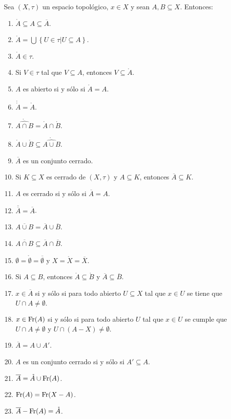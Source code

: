 \documentclass[12pt]{report}
\theoremstyle{largebreak}
\newcommand{\Int}[1]{\ensuremath{\mathring{#1}}}
\newcommand{\Cls}[1]{\ensuremath{\overline{#1}}}
\newcommand{\Fr}[1]{\ensuremath{\textup{Fr}(#1)}}
\begin{document}
    \begin{propo}
        Sea $(X,\tau)$ un espacio topológico, $x\in X$ y sean $A,B\subseteq X$. Entonces:
        \begin{enumerate}
            \item $\Int{A}\subseteq A\subseteq\Cls{A}$.
            \item $\Int{A}=\bigcup\left\{U\in\tau\big|U\subseteq A \right\}$.
            \item $\Int{A}\in\tau$.
            \item Si $V\in\tau$ tal que $V\subseteq A$, entonces $V\subseteq\Int{A}$.
            \item $A$ es abierto si y sólo si $\Int{A}=A$.
            \item $\Int{\Int{A}}=\Int{A}$.
            \item $\Int{\widehat{A\cap B}}=\Int{A}\cap\Int{B}$.
            \item $\Int{A}\cup\Int{B}\subseteq \Int{\widehat{A\cup B}}$.
            \item $\Cls{A}$ es un conjunto cerrado.
            \item Si $K\subseteq X$ es cerrado de $(X,\tau)$ y $A\subseteq K$, entonces $\Cls{A}\subseteq K$.
            \item $A$ es cerrado si y sólo si $\Cls{A}=A$.
            \item $\Cls{\Cls{A}}=\Cls{A}$.
            \item $\Cls{A\cup B}=\Cls{A}\cup\Cls{B}$.
            \item $\Cls{A\cap B}\subseteq\Cls{A}\cap\Cls{B}$.
            \item $\emptyset=\Int{\emptyset}=\Cls{\emptyset}$ y $X=\Int{X}=\Cls{X}$.
            \item Si $A\subseteq B$, entonces $\Int{A}\subseteq \Int{B}$ y $\Cls{A}\subseteq\Cls{B}$.
            \item $x\in\Cls{A}$ si y sólo si para todo abierto $U\subseteq X$ tal que $x\in U$ se tiene que $U\cap A\neq\emptyset$.
            \item $x\in\Fr{A}$ si y sólo si para todo abierto $U$ tal que $x\in U$ se cumple que $U\cap A\neq\emptyset$ y $U\cap (A-X)\neq\emptyset$.
            \item $\Cls{A}=A\cup A'$.
            \item $A$ es un conjunto cerrado si y sólo si $A'\subseteq A$.
            \item $\Cls{A}=\Int{A}\cup\Fr{A}$.
            \item $\Fr{A}=\Fr{X-A}$.
            \item $\Cls{A}-\Fr{A}=\Int{A}$.
        \end{enumerate}
    \end{propo}
\end{document}
